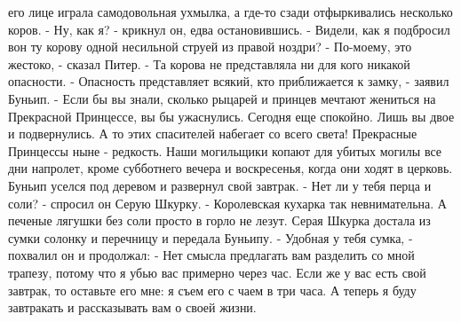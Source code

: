 его лице играла самодовольная ухмылка, а где-то сзади отфыркивались 
несколько коров.
    - Ну, как я? - крикнул он, едва остановившись. - Видели, как я 
подбросил вон ту корову одной несильной струей из правой ноздри?
    - По-моему, это жестоко, - сказал Питер. - Та корова не 
представляла ни для кого никакой опасности.
    - Опасность представляет всякий, кто приближается к замку, - 
заявил Буньип. - Если бы вы знали, сколько рыцарей и принцев мечтают 
жениться на Прекрасной Принцессе, вы бы ужаснулись. Сегодня еще 
спокойно. Лишь вы двое и подвернулись. А то этих спасителей набегает 
со всего света! Прекрасные Принцессы ныне - редкость. Наши могильщики 
копают для убитых могилы все дни напролет, кроме субботнего вечера и 
воскресенья, когда они ходят в церковь.
    Буньип уселся под деревом и развернул свой завтрак.
    - Нет ли у тебя перца и соли? - спросил он Серую Шкурку. - 
Королевская кухарка так невнимательна. А печеные лягушки без соли 
просто в горло не лезут.
    Серая Шкурка достала из сумки солонку и перечницу и передала 
Буньипу.
    - Удобная у тебя сумка, - похвалил он и продолжал: - Нет смысла 
предлагать вам разделить со мной трапезу, потому что я убью вас 
примерно через час. Если же у вас есть свой завтрак, то оставьте его 
мне: я съем его с чаем в три часа. А теперь я буду завтракать и 
рассказывать вам о своей жизни.
